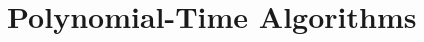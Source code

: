 \documentclass[9pt,twocolumn]{scrartcl}
\begin{document}

\section{Polynomial-Time Algorithms}\label{sec:poly}
\end{document}
